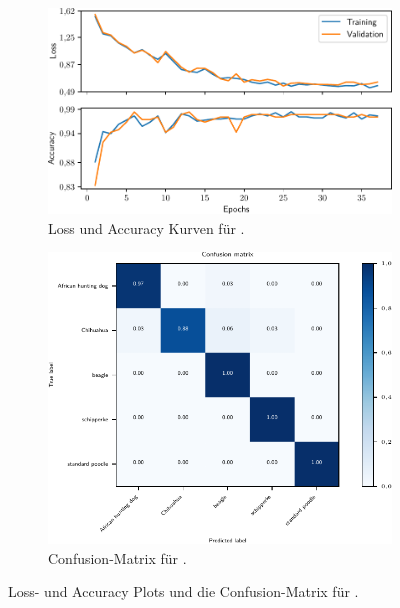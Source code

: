 \begin{figure}
  \begin{subfigure}{0.49\textwidth}
    \centering
    \includegraphics[width=\textwidth]{pics/ergebnisse/PreDogNN/history_epoch.pdf}
    \caption{Loss und Accuracy Kurven für \PreDog{}.}
    \label{fig:loss-acc-predog}
  \end{subfigure}
  \qquad
  \begin{subfigure}{0.49\textwidth}
    \centering
    \includegraphics[width=\textwidth]{pics/ergebnisse/PreDogNN/confusion_matrix.pdf}
    \caption{Confusion-Matrix für \PreDog{}.}
    \label{fig:confusion-predog}
  \end{subfigure}
  \caption{Loss- und Accuracy Plots und die Confusion-Matrix für \PreDog{}.}
  \label{fig:plots-predog}
\end{figure}

